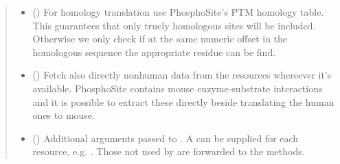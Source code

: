 \documentclass[letterpaper,10pt,english]{sphinxmanual}
\begin{document}
\begin{fulllineitems}
\begin{fulllineitems}
\begin{quote}
\begin{description}
\begin{itemize}
\item {} 
 () \textendash{} For homology translation use
PhosphoSite’s PTM homology table. This guarantees that only
truely homologous sites will be included. Otherwise we only
check if at the same numeric offset in the homologous sequence
the appropriate residue can be find.

\item {} 
 () \textendash{} Fetch also directly nonhuman
data from the resources whereever it’s available. PhosphoSite
contains mouse enzyme-substrate interactions and it is possible
to extract these directly beside translating the human ones
to mouse.

\item {} 
 () \textendash{} Additional arguments passed to .
A  can be supplied for each resource, e.g.
.
Those not used by  are forwarded to the
 methods.

\end{itemize}

\end{description}\end{quote}

\end{fulllineitems}



\end{fulllineitems}
\end{document}
